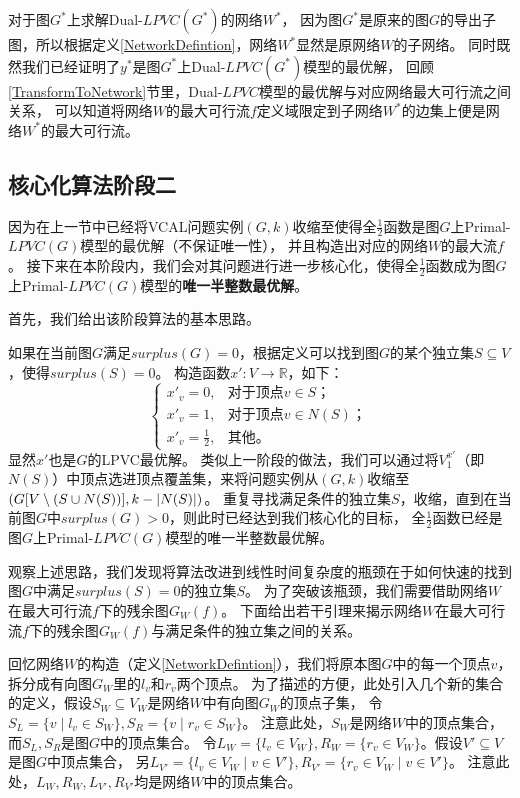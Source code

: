对于图$G^*$上求解Dual-$LPVC(G^*)$的网络$W^*$，
因为图$G^*$是原来的图$G$的导出子图，所以根据定义\ref{NetworkDefintion}，网络$W^*$显然是原网络$W$的子网络。
同时既然我们已经证明了$y^*$是图$G^*$上Dual-$LPVC(G^*)$模型的最优解，
回顾\ref{TransformToNetwork}节里，Dual-$LPVC$模型的最优解与对应网络最大可行流之间关系，
可以知道将网络$W$的最大可行流$f$定义域限定到子网络$W^*$的边集上便是网络$W^*$的最大可行流。

\subsection{核心化算法阶段二}
因为在上一节中已经将VCAL问题实例$(G, k)$收缩至使得全$\frac{1}{2}$函数是图$G$上Primal-$LPVC(G)$模型的最优解（不保证唯一性），
并且构造出对应的网络$W$的最大流$f$。
接下来在本阶段内，我们会对其问题进行进一步核心化，使得全$\frac{1}{2}$函数成为图$G$上Primal-$LPVC(G)$模型的\textbf{唯一半整数最优解}。
\vspace{0.5cm}

首先，我们给出该阶段算法的基本思路。

如果在当前图$G$满足$surplus(G) = 0$，根据定义可以找到图$G$的某个独立集$S \subseteq V$，使得$surplus(S) = 0$。
构造函数$x':V \rightarrow \mathbb{R}$，如下：
\begin{equation*}
   \begin{cases}
            x'_v =0, & \mbox{对于顶点$v \in S$；}  \\
            x'_v =1, & \mbox{对于顶点$v \in N(S)$；}  \\
            x'_v =\frac{1}{2}, & \mbox{其他。}
          \end{cases}
\end{equation*}
显然$x'$也是$G$的LPVC最优解。
类似上一阶段的做法，我们可以通过将$V^{x'}_1$（即$N(S)$）中顶点选进顶点覆盖集，来将问题实例从$(G,k)$收缩至$(G[V\setminus(S \cup N(S))], k - \left\vert N(S) \right\vert)$。
重复寻找满足条件的独立集$S$，收缩，直到在当前图$G$中$surplus(G) > 0$，则此时已经达到我们核心化的目标，
全$\frac{1}{2}$函数已经是图$G$上Primal-$LPVC(G)$模型的唯一半整数最优解。

观察上述思路，我们发现将算法改进到线性时间复杂度的瓶颈在于如何快速的找到图$G$中满足$surplus(S) = 0$的独立集$S$。
为了突破该瓶颈，我们需要借助网络$W$在最大可行流$f$下的残余图$G_W(f)$。
下面给出若干引理来揭示网络$W$在最大可行流$f$下的残余图$G_W(f)$与满足条件的独立集之间的关系。

回忆网络$W$的构造（定义\ref{NetworkDefintion}），我们将原本图$G$中的每一个顶点$v$，拆分成有向图$G_W$里的$l_v$和$r_v$两个顶点。
为了描述的方便，此处引入几个新的集合的定义，假设$S_W \subseteq V_W$是网络$W$中有向图$G_W$的顶点子集，
令$S_L = \{v\;|\;l_v \in S_W\},S_R = \{v\;|\;r_v \in S_W\}$。
注意此处，$S_W$是网络$W$中的顶点集合，而$S_L, S_R$是图$G$中的顶点集合。
令$L_W = \{l_v \in V_W\}, R_W = \{r_v \in V_W\}$。假设$V' \subseteq V$是图$G$中顶点集合，
另$L_{V'} = \{l_v\in V_W\;|\;v \in V'\},R_{V'} = \{r_v\in V_W\;|\;v \in V'\}$。
注意此处，$L_W, R_W, L_{V'}, R_{V'}$均是网络$W$中的顶点集合。


